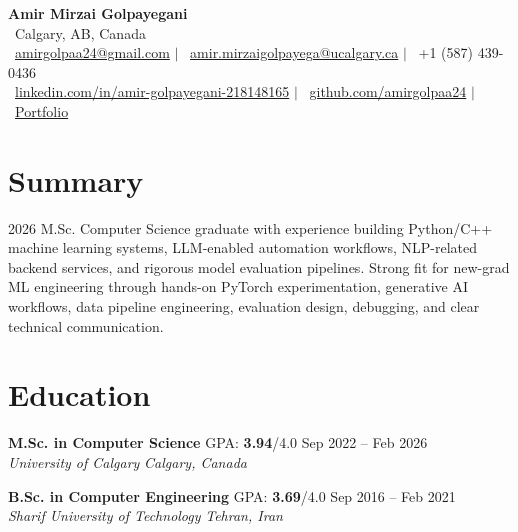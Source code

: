 \documentclass[a4paper,10pt]{article}
\newcommand{\resumeEducationSubheading}[5]{
    \textbf{#1} \hfill #2 \hfill #3 \\
    \textit{#4} \hfill \textit{#5}
}
\begin{document}

\begin{center}
    {\LARGE \textbf{Amir Mirzai Golpayegani}} \\[0.25em]
    \faMapMarker*~Calgary, AB, Canada \\[0.25em]
    \faEnvelope~\href{mailto:amirgolpaa24@gmail.com}{amirgolpaa24@gmail.com}
    $|$
    \faEnvelope~\href{mailto:amir.mirzaigolpayega@ucalgary.ca}{amir.mirzaigolpayega@ucalgary.ca}
    $|$
    \faPhone*~+1 (587) 439-0436 \\[0.25em]
    \faLinkedin~\href{https://linkedin.com/in/amir-golpayegani-218148165}{linkedin.com/in/amir-golpayegani-218148165}
    $|$
    \faGithub~\href{https://github.com/amirgolpaa24}{github.com/amirgolpaa24}
    $|$
    \faGlobe~\href{https://amir-portfolio-navy.vercel.app/}{Portfolio}
\end{center}


\section*{Summary}

2026 M.Sc. Computer Science graduate with experience building Python/C++ machine learning systems, LLM-enabled automation workflows, NLP-related backend services, and rigorous model evaluation pipelines. Strong fit for new-grad ML engineering through hands-on PyTorch experimentation, generative AI workflows, data pipeline engineering, evaluation design, debugging, and clear technical communication.


\section*{Education}

\resumeEducationSubheading
{M.Sc. in Computer Science}
{GPA: \textbf{3.94}/4.0}
{Sep 2022 -- Feb 2026}
{University of Calgary}
{Calgary, Canada}

\vspace{0.35em}

\resumeEducationSubheading
{B.Sc. in Computer Engineering}
{GPA: \textbf{3.69}/4.0}
{Sep 2016 -- Feb 2021}
{Sharif University of Technology}
{Tehran, Iran}

\end{document}
